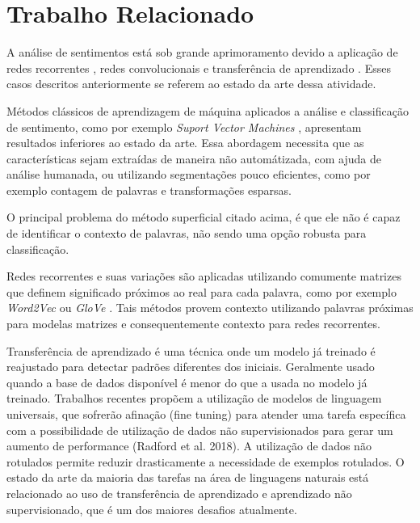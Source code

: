 \documentclass[12pt]{article}
\begin{document}
\section{Trabalho Relacionado} \label{sec:relacionado}

A análise de sentimentos está sob grande aprimoramento devido a aplicação de redes recorrentes \cite{karpathy:2015}, redes convolucionais \cite{lecun:98} e transferência de aprendizado \cite{DBLP:journals/corr/abs-1801-06146}. Esses casos descritos anteriormente se referem ao estado da arte dessa atividade.

Métodos clássicos de aprendizagem de máquina aplicados a análise e classificação de sentimento, como por exemplo \textit{Suport Vector Machines} \cite{DBLP:journals/ml/CortesV95}, apresentam resultados inferiores ao estado da arte. Essa abordagem necessita que as características sejam extraídas de maneira não automátizada, com ajuda de análise humanada, ou utilizando segmentações pouco eficientes, como por exemplo contagem de palavras e transformações esparsas.

O principal problema do método superficial citado acima, é que ele não é capaz de identificar o contexto de palavras, não sendo uma opção robusta para classificação.

Redes recorrentes e suas variações são aplicadas utilizando comumente matrizes que definem significado próximos ao real para cada palavra, como por exemplo \textit{Word2Vec} \cite{DBLP:journals/corr/abs-1301-3781} ou \textit{GloVe} \cite{pennington2014glove}. Tais métodos provem contexto utilizando palavras próximas para modelas matrizes e consequentemente contexto para redes recorrentes.

Transferência de aprendizado é uma técnica onde um modelo já treinado é reajustado para detectar padrões diferentes dos iniciais. Geralmente usado quando a base de dados disponível é menor do que a usada no modelo já treinado. Trabalhos recentes propõem a utilização de modelos de linguagem universais, que sofrerão afinação (fine tuning) para atender uma tarefa específica \cite{DBLP:journals/corr/abs-1801-06146} com a possibilidade de utilização de dados não supervisionados para gerar um aumento de performance (Radford et al. 2018). A utilização de dados não rotulados permite reduzir drasticamente a necessidade de exemplos rotulados. O estado da arte da maioria das tarefas na área de linguagens naturais está relacionado ao uso de transferência de aprendizado e aprendizado não supervisionado, que é um dos maiores desafios atualmente.
\end{document}
